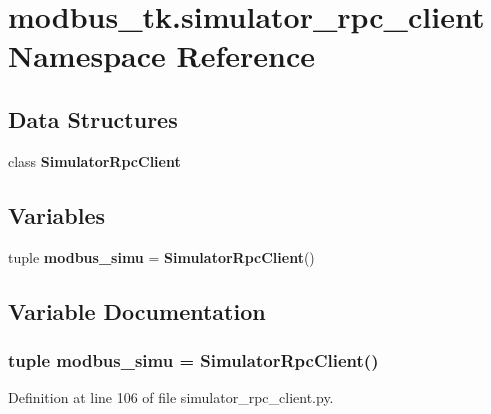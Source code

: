 \section{modbus\+\_\+tk.\+simulator\+\_\+rpc\+\_\+client Namespace Reference}
\label{namespacemodbus__tk_1_1simulator__rpc__client}
\subsection*{Data Structures}
\begin{DoxyCompactItemize}
\item 
class {\bf Simulator\+Rpc\+Client}
\end{DoxyCompactItemize}
\subsection*{Variables}
\begin{DoxyCompactItemize}
\item 
tuple {\bf modbus\+\_\+simu} = {\bf Simulator\+Rpc\+Client}()
\end{DoxyCompactItemize}


\subsection{Variable Documentation}
\subsubsection[{modbus\+\_\+simu}]{\setlength{\rightskip}{0pt plus 5cm}tuple modbus\+\_\+simu = {\bf Simulator\+Rpc\+Client}()}\label{namespacemodbus__tk_1_1simulator__rpc__client_a4dadfb4e9a17313431bb309f5f976d71}


Definition at line 106 of file simulator\+\_\+rpc\+\_\+client.\+py.

